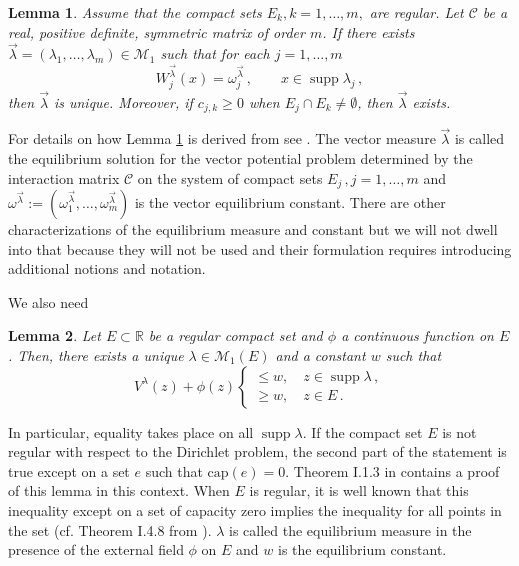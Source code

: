 \documentclass{amsart}
\newtheorem{lemma}{\sc Lemma}[section]
\theoremstyle{definition}
\theoremstyle{remark}
\newcommand{\supp}{\operatorname{supp }}
\begin{document}
\begin{lemma} \label{niksor} Assume that the compact sets
$E_k,k=1,\ldots,m,$ are regular. Let $\mathcal{C}$ be a real, positive definite, symmetric
matrix of order $m$. If there exists $\vec{\lambda}  =
(\lambda_{1},\ldots,\lambda_{m})\in
\mathcal{M}_1$ such that for each $j=1,\ldots,m$
\[
W_j^{\vec{\lambda}} (x) = \omega_j^{\vec{\lambda}}\,, \qquad x
\in \supp{\lambda_j}\,,
\]
then $\vec{\lambda}$ is unique. Moreover, if $c_{j,k} \geq 0$
when $E_j \cap E_k \neq \emptyset$, then $\vec{\lambda}$ exists.
\end{lemma}

\medskip

For details on how Lemma \ref{niksor} is derived from  \cite[Chapter
5]{NiSo} see  \cite[Section 4]{bel}. The vector measure $\vec{\lambda}$
is called the equilibrium solution for the vector potential problem determined by the
interaction matrix $\mathcal{C}$ on the system of compact sets
$E_j\,, j = 1,\ldots,m$ and $\omega^{\vec{\lambda}}:= (\omega_1^{\vec{\lambda}},\ldots,\omega_m^{\vec{\lambda}})$ is the vector equilibrium constant. There are other characterizations of the equilibrium measure and constant but we will not dwell into that because they will not be used and their formulation requires introducing additional notions and notation.

\medskip



We also need

\begin{lemma} \label{lemextremal}
Let $E \subset \mathbb{R}$ be a regular compact set and $\phi$ a continuous function
on $E$. Then, there exists a unique $\lambda \in
\mathcal{M}_1(E)$ and a constant $w$ such that
\[
V^{\lambda}(z)+\phi(z) \left\{ \begin{array}{l} \leq
w,\quad z
\in \supp{\lambda} \,, \\
\geq w, \quad z \in  E\,.
\end{array} \right.
\]
\end{lemma}

In particular, equality takes place on all $\supp{\lambda}$.
If the compact set $E$ is not regular with respect to the
Dirichlet problem, the second part of the statement is true
except on a set $e$ such that $\mbox{cap}(e) =0.$ Theorem I.1.3 in
\cite{ST} contains a proof of this lemma in this context. When $E$
is regular, it is well known that this inequality except on a set
of capacity zero implies the inequality for all points in the set
(cf. Theorem I.4.8 from \cite{ST}). $\lambda$ is called the
equilibrium measure in the presence
of the external field $\phi$ on $E$ and $w$ is  the equilibrium
constant.
\end{document}
